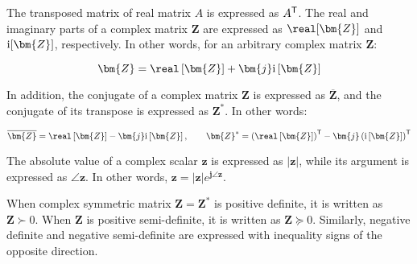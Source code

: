 \documentclass[graybox, envcountchap]{svmult}
\begin{document}
The transposed matrix of real matrix $A$ is expressed as $A^{\sf T}$. The real
and imaginary parts of a complex matrix $\bm{Z}$ are expressed as
$\real[\bm{Z}]$ and $\imag[\bm{Z}]$, respectively. In other words, for an
arbitrary complex matrix $\bm{Z}$:

\[
\bm{Z} = \real \left[\bm{Z} \right] + \bm{j} \imag \left[\bm{Z} \right]
\]

In addition, the conjugate of a complex matrix $\bm{Z}$ is expressed as
$\overline{\bm{Z}}$, and the conjugate of its transpose is expressed as
$\bm{Z}^*$. In other words:

\[
\overline{\bm{Z}} = \real \left[\bm{Z} \right] - \bm{j} \imag \left[\bm{Z} \right]
,\qquad
\bm{Z}^* = \left(\real \left[\bm{Z} \right] \right)^{\sf T} - \bm{j} 
\left( \imag \left[\bm{Z} \right] \right)^{\sf T}
\]

The absolute value of a complex scalar $\bm{z}$ is expressed as $|\bm{z}|$,
while its argument is expressed as $\angle \bm{z}$.  In other words, $\bm{z} =
|\bm{z}|e^{\bm{j} \angle \bm{z}}$.

When complex symmetric matrix $\bm{Z}=\bm{Z}^*$ is positive definite, it is
written as $\bm{Z}\succ 0$. When $\bm{Z}$ is positive semi-definite, it is
written as $\bm{Z}\succeq 0$. Similarly, negative definite and negative
semi-definite are expressed with inequality signs of the opposite direction.

\end{document}
